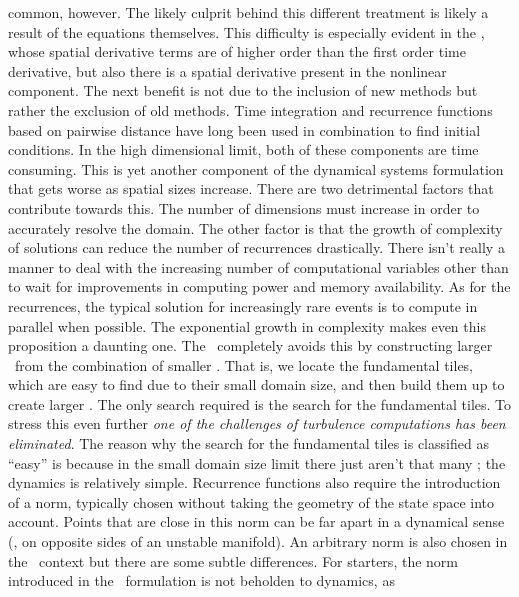 common, however. The likely culprit behind this different treatment
is likely a result of the equations themselves. This difficulty
is especially evident in the \KSe, whose spatial derivative terms
are of higher order than the first order time derivative, but also
there is a spatial derivative present in the nonlinear component.
%
The next benefit is not due to the inclusion of new methods but
rather the exclusion of old methods. Time integration and
recurrence functions based on pairwise distance have long been used in combination
to find initial conditions. %
In the high dimensional limit, both
of these components are time consuming. This is yet another
component of the dynamical systems formulation that gets worse
as spatial sizes increase. There are two detrimental factors
that contribute towards this. The number of dimensions must increase
in order to accurately resolve the domain. The other factor is that
the growth of complexity of solutions can reduce the number of recurrences
drastically. There isn't really a manner to deal with the increasing
number of computational variables other than to wait for improvements
in computing power and memory availability. As for the recurrences, the
typical solution for increasingly rare events is to compute in parallel when
possible. The exponential growth in complexity makes even this proposition
a daunting one.
The \spt\ completely avoids this by constructing larger \twots\
from the combination of smaller \twots. That is,
we locate the fundamental tiles, which are easy to find due to their small
domain size, and then build them up to create larger \twots. The only
search required is the search for the fundamental tiles. To stress
this even further \textit{one of the challenges of turbulence
computations has been eliminated}. The reason
why the search for the fundamental tiles is classified as ``easy'' is because
in the small domain size limit there just aren't that many \twots; the dynamics
is relatively simple.
Recurrence functions also require the introduction of a norm,
typically chosen without taking the geometry of the state space into account.
Points that are close in this norm can be far apart in a dynamical sense (\ie, on opposite sides
of an unstable manifold). An arbitrary norm is also chosen in the \spt\
context but there are some subtle differences. For starters, the
norm introduced in the \spt\ formulation is not beholden to dynamics, as
